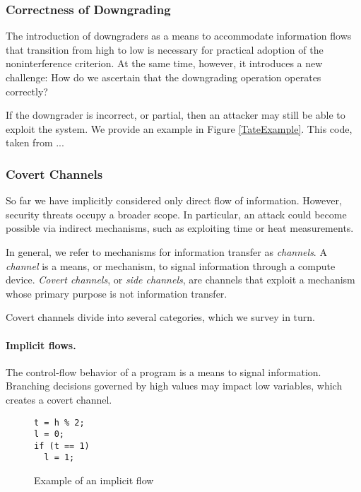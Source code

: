 \subsubsection{Correctness of Downgrading}

The introduction of downgraders as a means to accommodate information flows that transition from high to low is necessary for practical adoption of the noninterference criterion. At the same time, however, it introduces a new challenge: How do we ascertain that the downgrading operation operates correctly?

If the downgrader is incorrect, or partial, then an attacker may still be able to exploit the system. We provide an example in Figure \ref{TateExample}. This code, taken from ...



\subsubsection{Covert Channels}

So far we have implicitly considered only direct flow of information. However, security threats occupy a broader scope. In particular, an attack could become possible via indirect mechanisms, such as exploiting time or heat measurements.

In general, we refer to mechanisms for information transfer as \emph{channels}. A \emph{channel} is a means, or mechanism, to signal information through a compute device. 
\emph{Covert channels}, or \emph{side channels}, are channels that exploit a mechanism whose primary purpose is not information transfer.

Covert channels divide into several categories, which we survey in turn.

\paragraph{Implicit flows.} The control-flow behavior of a program is a means to signal information. Branching decisions governed by high values may impact low variables, which creates a covert channel.

\begin{figure}
	\begin{lstlisting}
t = h % 2;
l = 0;
if (t == 1) 
  l = 1;
	\end{lstlisting}
\caption{\label{Fi:implicitFlow}Example of an implicit flow}
\end{figure}

